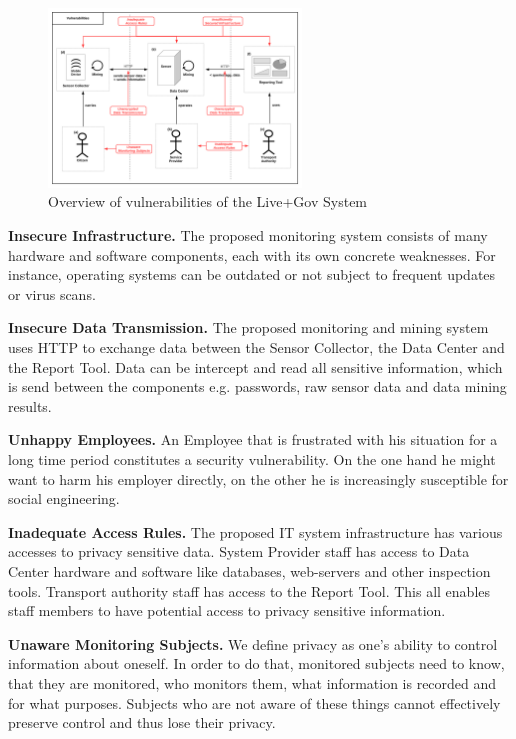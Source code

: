 \documentclass[runningheads,a4paper]{llncs}
\begin{document}
\begin{figure}
\centering
\includegraphics[width=0.6\textwidth]{diagrams/png/vulnerabilities.png}

\caption{Overview of vulnerabilities of the Live+Gov System }
\label{figure:Live+Gov Vulnerabilities}
\end{figure}

\textbf{Insecure Infrastructure.}
The proposed monitoring system consists of many hardware and software components, each with its own concrete weaknesses. For instance, operating systems can be outdated or not subject to frequent updates or virus scans.

\textbf{Insecure Data Transmission.}
The proposed monitoring and mining system uses HTTP to exchange data between the Sensor Collector, the Data Center and the Report Tool.
Data can be intercept and read all sensitive information, which is send between the components e.g. passwords, raw sensor data and data mining results.

\textbf{Unhappy Employees.}
An Employee that is frustrated with his situation for a long time
period constitutes a security vulnerability. On the one hand he might
want to harm his employer directly, on the other he is increasingly
susceptible for social engineering.

\textbf{Inadequate Access Rules.}
The proposed IT system infrastructure has various accesses to privacy sensitive data.
System Provider staff has access to Data Center hardware and software like databases, web-servers and other inspection tools. Transport authority staff has access to the Report Tool. This all enables staff members to have potential access to privacy sensitive information.


\textbf{Unaware Monitoring Subjects.}
We define privacy as one's ability to control information about
oneself.  In order to do that, monitored subjects need to know, that
they are monitored, who monitors them, what information is recorded
and for what purposes.  Subjects who are not aware of these things
cannot effectively preserve control and thus lose their privacy. 
\end{document}
